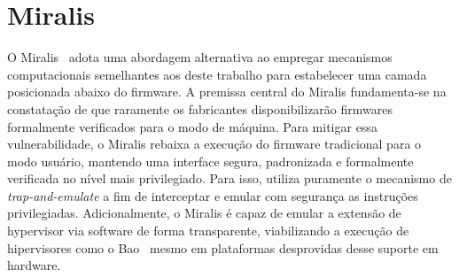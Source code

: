 \section{Miralis}

O Miralis~\cite{miralis} adota uma abordagem alternativa ao empregar mecanismos computacionais semelhantes aos deste trabalho para estabelecer uma camada posicionada abaixo do firmware.
A premissa central do Miralis fundamenta-se na constatação de que raramente os fabricantes disponibilizarão firmwares formalmente verificados para o modo de máquina.
Para mitigar essa vulnerabilidade, o Miralis rebaixa a execução do firmware tradicional para o modo usuário, mantendo uma interface segura, padronizada e formalmente verificada no nível mais
privilegiado. Para isso, utiliza puramente o mecanismo de \textit{trap-and-emulate} a fim de interceptar e emular com segurança as instruções privilegiadas.
Adicionalmente, o Miralis é capaz de emular a extensão de hypervisor via software de forma transparente, viabilizando a execução de hipervisores como o Bao~\cite{bao-paper}
mesmo em plataformas desprovidas desse suporte em hardware.

